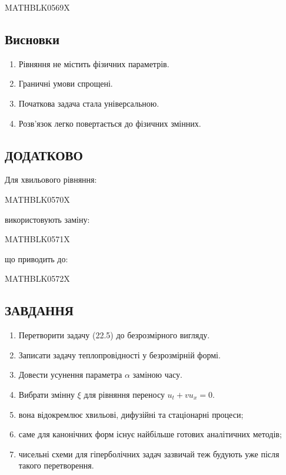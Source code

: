 \documentclass[
  ukrainian,
]{article}
\providecommand{\tightlist}{%
  \setlength{\itemsep}{0pt}\setlength{\parskip}{0pt}}
\begin{document}
MATHBLK0569X

\subsection{Висновки}\label{ux432ux438ux441ux43dux43eux432ux43aux438}

\begin{enumerate}
\def\labelenumi{\arabic{enumi}.}
\tightlist
\item
  Рівняння не містить фізичних параметрів.
\item
  Граничні умови спрощені.
\item
  Початкова задача стала універсальною.
\item
  Розв'язок легко повертається до фізичних змінних.
\end{enumerate}

\subsection{ДОДАТКОВО}\label{ux434ux43eux434ux430ux442ux43aux43eux432ux43e}

Для хвильового рівняння:

MATHBLK0570X

використовують заміну:

MATHBLK0571X

що приводить до:

MATHBLK0572X

\subsection{ЗАВДАННЯ}\label{ux437ux430ux432ux434ux430ux43dux43dux44f-15}

\begin{enumerate}
\def\labelenumi{\arabic{enumi}.}
\tightlist
\item
  Перетворити задачу (22.5) до безрозмірного вигляду.
\item
  Записати задачу теплопровідності у безрозмірній формі.
\item
  Довести усунення параметра \(\alpha\) заміною часу.
\item
  Вибрати змінну \(\xi\) для рівняння переносу \(u_t + v u_x = 0\).
\item
  вона відокремлює хвильові, дифузійні та стаціонарні процеси;
\item
  саме для канонічних форм існує найбільше готових аналітичних методів;
\item
  чисельні схеми для гіперболічних задач зазвичай теж будують уже після
  такого перетворення.
\end{enumerate}
\end{document}
